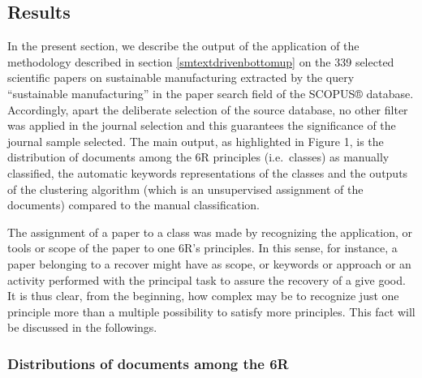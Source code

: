 \documentclass[]{book}
\begin{document}
\subsection{Results}\label{results-3}

In the present section, we describe the output of the application of the
methodology described in section \ref{smtextdrivenbottomup} on the 339
selected scientific papers on sustainable manufacturing extracted by the
query ``sustainable manufacturing'' in the paper search field of the
SCOPUS® database. Accordingly, apart the deliberate selection of the
source database, no other filter was applied in the journal selection
and this guarantees the significance of the journal sample selected. The
main output, as highlighted in Figure 1, is the distribution of
documents among the 6R principles (i.e.~classes) as manually classified,
the automatic keywords representations of the classes and the outputs of
the clustering algorithm (which is an unsupervised assignment of the
documents) compared to the manual classification.

The assignment of a paper to a class was made by recognizing the
application, or tools or scope of the paper to one 6R's principles. In
this sense, for instance, a paper belonging to a recover might have as
scope, or keywords or approach or an activity performed with the
principal task to assure the recovery of a give good. It is thus clear,
from the beginning, how complex may be to recognize just one principle
more than a multiple possibility to satisfy more principles. This fact
will be discussed in the followings.

\subsubsection*{Distributions of documents among the
6R}\label{distributions-of-documents-among-the-6r}
\end{document}
